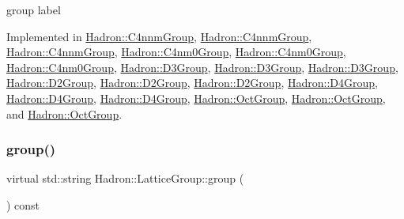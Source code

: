 group label 

Implemented in \mbox{\hyperlink{structHadron_1_1C4nnmGroup_a9f35739dbd3ad6effd0e675d40b5341d}{Hadron\+::\+C4nnm\+Group}}, \mbox{\hyperlink{structHadron_1_1C4nnmGroup_a9f35739dbd3ad6effd0e675d40b5341d}{Hadron\+::\+C4nnm\+Group}}, \mbox{\hyperlink{structHadron_1_1C4nnmGroup_a9f35739dbd3ad6effd0e675d40b5341d}{Hadron\+::\+C4nnm\+Group}}, \mbox{\hyperlink{structHadron_1_1C4nm0Group_a2a84060776245ed0045a7271b00064eb}{Hadron\+::\+C4nm0\+Group}}, \mbox{\hyperlink{structHadron_1_1C4nm0Group_a2a84060776245ed0045a7271b00064eb}{Hadron\+::\+C4nm0\+Group}}, \mbox{\hyperlink{structHadron_1_1C4nm0Group_a2a84060776245ed0045a7271b00064eb}{Hadron\+::\+C4nm0\+Group}}, \mbox{\hyperlink{structHadron_1_1D3Group_a60e24b1e2d17481b7ab94860c95ce155}{Hadron\+::\+D3\+Group}}, \mbox{\hyperlink{structHadron_1_1D3Group_a60e24b1e2d17481b7ab94860c95ce155}{Hadron\+::\+D3\+Group}}, \mbox{\hyperlink{structHadron_1_1D3Group_a60e24b1e2d17481b7ab94860c95ce155}{Hadron\+::\+D3\+Group}}, \mbox{\hyperlink{structHadron_1_1D2Group_aa6d99edf22f99550602f38437aadd890}{Hadron\+::\+D2\+Group}}, \mbox{\hyperlink{structHadron_1_1D2Group_aa6d99edf22f99550602f38437aadd890}{Hadron\+::\+D2\+Group}}, \mbox{\hyperlink{structHadron_1_1D2Group_aa6d99edf22f99550602f38437aadd890}{Hadron\+::\+D2\+Group}}, \mbox{\hyperlink{structHadron_1_1D4Group_ae6c08a58023532bcf277f60c1dddde4f}{Hadron\+::\+D4\+Group}}, \mbox{\hyperlink{structHadron_1_1D4Group_ae6c08a58023532bcf277f60c1dddde4f}{Hadron\+::\+D4\+Group}}, \mbox{\hyperlink{structHadron_1_1D4Group_ae6c08a58023532bcf277f60c1dddde4f}{Hadron\+::\+D4\+Group}}, \mbox{\hyperlink{structHadron_1_1OctGroup_a0d21b9bbc5cc2cafa4945e9dd5608a6b}{Hadron\+::\+Oct\+Group}}, \mbox{\hyperlink{structHadron_1_1OctGroup_a0d21b9bbc5cc2cafa4945e9dd5608a6b}{Hadron\+::\+Oct\+Group}}, and \mbox{\hyperlink{structHadron_1_1OctGroup_a0d21b9bbc5cc2cafa4945e9dd5608a6b}{Hadron\+::\+Oct\+Group}}.

\mbox{\label{structHadron_1_1LatticeGroup_a82208a322bf1b1db489f16af38e70087}} 
\subsubsection{\texorpdfstring{group()}{group()}\hspace{0.1cm}{\footnotesize\ttfamily [3/3]}}
{\footnotesize\ttfamily virtual std\+::string Hadron\+::\+Lattice\+Group\+::group (\begin{DoxyParamCaption}{ }\end{DoxyParamCaption}) const\hspace{0.3cm}{\ttfamily [pure virtual]}}

